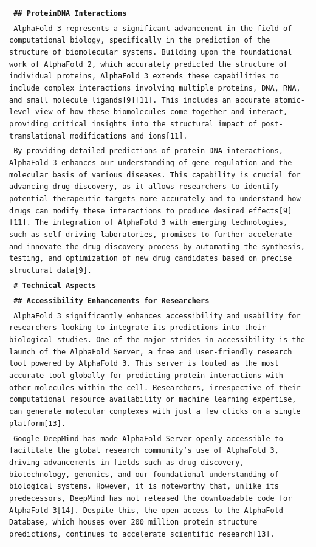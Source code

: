 \begin{longtable}{p{\textwidth}}
\vspace{1pt}
\texttt{\small{\textbf{ \#\# ProteinDNA Interactions }}} \\
\texttt{\small{ AlphaFold 3 represents a significant advancement in the field of computational biology, specifically in the prediction of the structure of biomolecular systems. Building upon the foundational work of AlphaFold 2, which accurately predicted the structure of individual proteins, AlphaFold 3 extends these capabilities to include complex interactions involving multiple proteins, DNA, RNA, and small molecule ligands[9][11]. This includes an accurate atomic-level view of how these biomolecules come together and interact, providing critical insights into the structural impact of post-translational modifications and ions[11]. }} \\
\texttt{\small{ By providing detailed predictions of protein-DNA interactions, AlphaFold 3 enhances our understanding of gene regulation and the molecular basis of various diseases. This capability is crucial for advancing drug discovery, as it allows researchers to identify potential therapeutic targets more accurately and to understand how drugs can modify these interactions to produce desired effects[9][11]. The integration of AlphaFold 3 with emerging technologies, such as self-driving laboratories, promises to further accelerate and innovate the drug discovery process by automating the synthesis, testing, and optimization of new drug candidates based on precise structural data[9]. }} \\
\vspace{1pt}
\texttt{\small{\textbf{ \# Technical Aspects }}} \\
\vspace{1pt}
\texttt{\small{\textbf{ \#\# Accessibility Enhancements for Researchers }}} \\
\texttt{\small{ AlphaFold 3 significantly enhances accessibility and usability for researchers looking to integrate its predictions into their biological studies. One of the major strides in accessibility is the launch of the AlphaFold Server, a free and user-friendly research tool powered by AlphaFold 3. This server is touted as the most accurate tool globally for predicting protein interactions with other molecules within the cell. Researchers, irrespective of their computational resource availability or machine learning expertise, can generate molecular complexes with just a few clicks on a single platform[13]. }} \\
\texttt{\small{ Google DeepMind has made AlphaFold Server openly accessible to facilitate the global research community's use of AlphaFold 3, driving advancements in fields such as drug discovery, biotechnology, genomics, and our foundational understanding of biological systems. However, it is noteworthy that, unlike its predecessors, DeepMind has not released the downloadable code for AlphaFold 3[14]. Despite this, the open access to the AlphaFold Database, which houses over 200 million protein structure predictions, continues to accelerate scientific research[13]. }} \\

\end{longtable}
